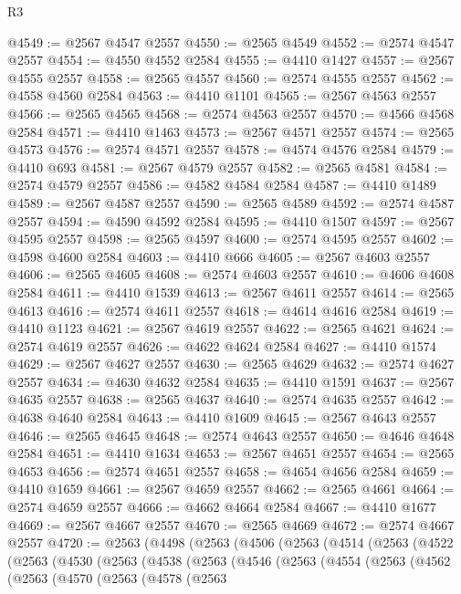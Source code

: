 \begin{lexlean}{R3}
\begin{coremodule}
@4549 := @2567 @4547 @2557
@4550 := @2565 @4549
@4552 := @2574 @4547 @2557
@4554 := @4550 @4552 @2584
@4555 := @4410 @1427
@4557 := @2567 @4555 @2557
@4558 := @2565 @4557
@4560 := @2574 @4555 @2557
@4562 := @4558 @4560 @2584
@4563 := @4410 @1101
@4565 := @2567 @4563 @2557
@4566 := @2565 @4565
@4568 := @2574 @4563 @2557
@4570 := @4566 @4568 @2584
@4571 := @4410 @1463
@4573 := @2567 @4571 @2557
@4574 := @2565 @4573
@4576 := @2574 @4571 @2557
@4578 := @4574 @4576 @2584
@4579 := @4410 @693
@4581 := @2567 @4579 @2557
@4582 := @2565 @4581
@4584 := @2574 @4579 @2557
@4586 := @4582 @4584 @2584
@4587 := @4410 @1489
@4589 := @2567 @4587 @2557
@4590 := @2565 @4589
@4592 := @2574 @4587 @2557
@4594 := @4590 @4592 @2584
@4595 := @4410 @1507
@4597 := @2567 @4595 @2557
@4598 := @2565 @4597
@4600 := @2574 @4595 @2557
@4602 := @4598 @4600 @2584
@4603 := @4410 @666
@4605 := @2567 @4603 @2557
@4606 := @2565 @4605
@4608 := @2574 @4603 @2557
@4610 := @4606 @4608 @2584
@4611 := @4410 @1539
@4613 := @2567 @4611 @2557
@4614 := @2565 @4613
@4616 := @2574 @4611 @2557
@4618 := @4614 @4616 @2584
@4619 := @4410 @1123
@4621 := @2567 @4619 @2557
@4622 := @2565 @4621
@4624 := @2574 @4619 @2557
@4626 := @4622 @4624 @2584
@4627 := @4410 @1574
@4629 := @2567 @4627 @2557
@4630 := @2565 @4629
@4632 := @2574 @4627 @2557
@4634 := @4630 @4632 @2584
@4635 := @4410 @1591
@4637 := @2567 @4635 @2557
@4638 := @2565 @4637
@4640 := @2574 @4635 @2557
@4642 := @4638 @4640 @2584
@4643 := @4410 @1609
@4645 := @2567 @4643 @2557
@4646 := @2565 @4645
@4648 := @2574 @4643 @2557
@4650 := @4646 @4648 @2584
@4651 := @4410 @1634
@4653 := @2567 @4651 @2557
@4654 := @2565 @4653
@4656 := @2574 @4651 @2557
@4658 := @4654 @4656 @2584
@4659 := @4410 @1659
@4661 := @2567 @4659 @2557
@4662 := @2565 @4661
@4664 := @2574 @4659 @2557
@4666 := @4662 @4664 @2584
@4667 := @4410 @1677
@4669 := @2567 @4667 @2557
@4670 := @2565 @4669
@4672 := @2574 @4667 @2557
@4720 := @2563
    (@4498
      (@2563
        (@4506
          (@2563
            (@4514
              (@2563
                (@4522
                  (@2563
                    (@4530
                      (@2563
                        (@4538
                          (@2563
                            (@4546
                              (@2563
                                (@4554
                                  (@2563
                                    (@4562
                                      (@2563
                                        (@4570
                                          (@2563
                                            (@4578
                                              (@2563

\end{coremodule}
\end{lexlean}
